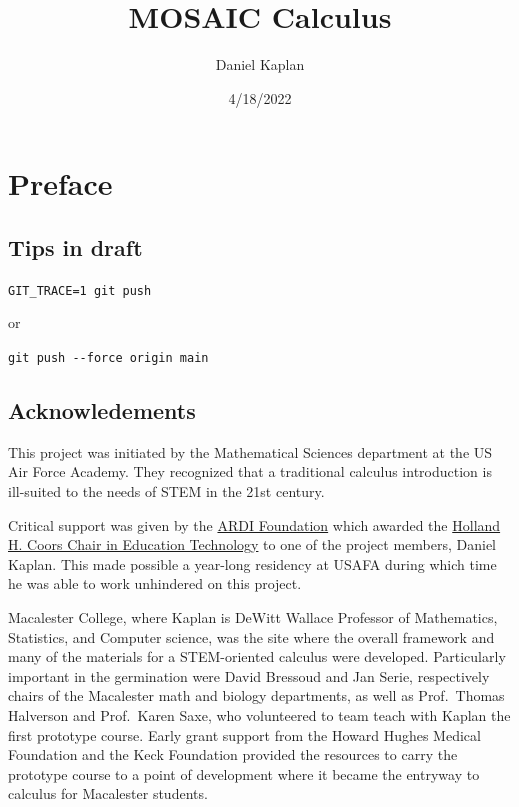 \documentclass[
  letterpaper,
  DIV=11,
  numbers=noendperiod,
  oneside]{scrreprt}
\title{MOSAIC Calculus}
\author{Daniel Kaplan}
\date{4/18/2022}
\renewcommand*\contentsname{Table of contents}
\begin{document}
\maketitle

\ifdefined\Shaded\renewenvironment{Shaded}{\begin{tcolorbox}[interior hidden, enhanced, borderline west={3pt}{0pt}{shadecolor}, frame hidden, boxrule=0pt, sharp corners]}{\end{tcolorbox}}\fi

\renewcommand*\contentsname{Table of contents}
{
\hypersetup{linkcolor=}
\setcounter{tocdepth}{2}
\tableofcontents
}
\hypertarget{preface}{%
\chapter*{Preface}\label{preface}}

\hypertarget{tips-in-draft}{%
\section*{Tips in draft}\label{tips-in-draft}}

\texttt{GIT\_TRACE=1\ git\ push}

or

\texttt{git\ push\ -\/-force\ origin\ main}

\hypertarget{acknowledements}{%
\section*{Acknowledements}\label{acknowledements}}

This project was initiated by the Mathematical Sciences department at
the US Air Force Academy. They recognized that a traditional calculus
introduction is ill-suited to the needs of STEM in the 21st century.

Critical support was given by the \href{http://ardifoundation.org}{ARDI
Foundation} which awarded the
\href{http://www.ardifoundation.org/coors-chair/}{Holland H. Coors Chair
in Education Technology} to one of the project members, Daniel Kaplan.
This made possible a year-long residency at USAFA during which time he
was able to work unhindered on this project.

Macalester College, where Kaplan is DeWitt Wallace Professor of
Mathematics, Statistics, and Computer science, was the site where the
overall framework and many of the materials for a STEM-oriented calculus
were developed. Particularly important in the germination were David
Bressoud and Jan Serie, respectively chairs of the Macalester math and
biology departments, as well as Prof.~Thomas Halverson and Prof.~Karen
Saxe, who volunteered to team teach with Kaplan the first prototype
course. Early grant support from the Howard Hughes Medical Foundation
and the Keck Foundation provided the resources to carry the prototype
course to a point of development where it became the entryway to
calculus for Macalester students.
\end{document}
